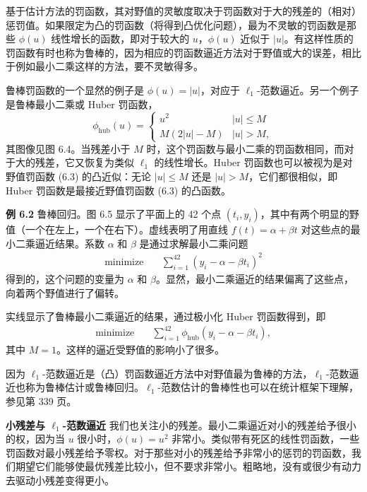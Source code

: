 \documentclass[UTF8,12pt,a4paper,fontset=fandol]{ctexart}
\begin{document}
基于估计方法的罚函数，其对野值的灵敏度取决于罚函数对于大的残差的（相对）惩罚值。如果限定为凸的罚函数（将得到凸优化问题），最为不灵敏的罚函数是那些 $\phi(u)$ 线性增长的函数，即对于较大的 $u$，$\phi(u)$ 近似于 $|u|$。有这样性质的罚函数有时也称为鲁棒的，因为相应的罚函数逼近方法对于野值或大的误差，相比于例如最小二乘这样的方法，要不灵敏得多。

鲁棒罚函数的一个显然的例子是 $\phi(u)=|u|$，对应于 $\ell_1$-范数逼近。另一个例子是鲁棒最小二乘或 Huber 罚函数，
\begin{equation}
\phi_{\mathrm{hub}}(u)=
\begin{cases}
u^2 & |u|\leq M\\
M(2|u|-M) & |u|>M,
\end{cases}
\tag{6.4}
\end{equation}
其图像见图 6.4。当残差小于 $M$ 时，这个罚函数与最小二乘的罚函数相同，而对于大的残差，它又恢复为类似 $\ell_1$ 的线性增长。Huber 罚函数也可以被视为是对野值罚函数 (6.3) 的凸近似：无论 $|u|\leq M$ 还是 $|u|>M$，它们都很相似，即 Huber 罚函数是最接近野值罚函数 (6.3) 的凸函数。

\noindent\textbf{例 6.2}\quad
鲁棒回归。图 6.5 显示了平面上的 42 个点 $(t_i,y_i)$，其中有两个明显的野值（一个在左上，一个在右下）。虚线表明了用直线 $f(t)=\alpha+\beta t$ 对这些点的最小二乘逼近结果。系数 $\alpha$ 和 $\beta$ 是通过求解最小二乘问题
\[
\begin{aligned}
\text{minimize}\quad & \sum_{i=1}^{42}(y_i-\alpha-\beta t_i)^2
\end{aligned}
\]
得到的，这个问题的变量为 $\alpha$ 和 $\beta$。显然，最小二乘逼近的结果偏离了这些点，向着两个野值进行了偏转。

实线显示了鲁棒最小二乘逼近的结果，通过极小化 Huber 罚函数得到，即
\[
\begin{aligned}
\text{minimize}\quad & \sum_{i=1}^{42}\phi_{\mathrm{hub}}(y_i-\alpha-\beta t_i),
\end{aligned}
\]
其中 $M=1$。这样的逼近受野值的影响小了很多。

因为 $\ell_1$-范数逼近是（凸）罚函数逼近方法中对野值最为鲁棒的方法，$\ell_1$-范数逼近也称为鲁棒估计或鲁棒回归。$\ell_1$-范数估计的鲁棒性也可以在统计框架下理解，参见第 339 页。

\noindent\textbf{小残差与 $\ell_1$-范数逼近}\quad
我们也关注小的残差。最小二乘逼近对小的残差给予很小的权，因为当 $u$ 很小时，$\phi(u)=u^2$ 非常小。类似带有死区的线性罚函数，一些罚函数对最小残差给予零权。对于那些对小的残差给予非常小的惩罚的罚函数，我们期望它们能够使最优残差比较小，但不要求非常小。粗略地，没有或很少有动力去驱动小残差变得更小。
\end{document}
